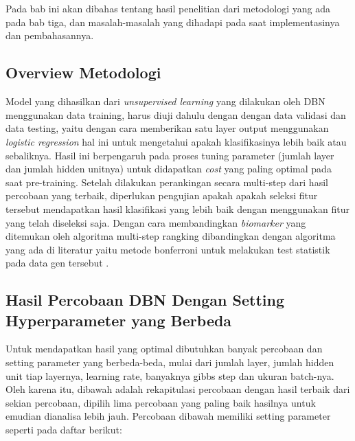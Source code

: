 \chapter{\babEmpat}

Pada bab ini akan dibahas tentang hasil penelitian dari metodologi yang ada pada bab tiga, dan masalah-masalah yang dihadapi pada saat implementasinya dan pembahasannya.


\section{Overview Metodologi}
Model yang dihasilkan dari \textit{unsupervised learning} yang dilakukan oleh DBN menggunakan data training, harus diuji dahulu dengan dengan data validasi dan data testing, yaitu dengan cara memberikan satu layer output menggunakan \textit{logistic regression} hal ini untuk mengetahui apakah klasifikasinya lebih baik atau sebaliknya. Hasil ini berpengaruh pada proses tuning parameter (jumlah layer dan jumlah hidden unitnya) untuk didapatkan \textit{cost} yang paling optimal pada saat pre-training. Setelah dilakukan perankingan secara multi-step dari hasil percobaan yang terbaik, diperlukan pengujian apakah apakah seleksi fitur tersebut mendapatkan hasil klasifikasi yang lebih baik dengan menggunakan fitur yang telah diseleksi saja. Dengan cara membandingkan \textit{biomarker} yang ditemukan oleh algoritma multi-step rangking dibandingkan dengan algoritma yang ada di literatur yaitu metode bonferroni untuk melakukan test statistik pada data gen tersebut \citep{hochberg1988sharper}. 


\section{Hasil Percobaan DBN Dengan Setting Hyperparameter yang Berbeda}
Untuk mendapatkan hasil yang optimal dibutuhkan banyak percobaan dan setting parameter yang berbeda-beda, mulai dari jumlah layer, jumlah hidden unit tiap layernya, learning rate, banyaknya gibbs step dan ukuran batch-nya. Oleh karena itu, dibawah adalah rekapitulasi percobaan dengan hasil terbaik dari sekian percobaan, dipilih lima percobaan yang paling baik hasilnya untuk emudian dianalisa lebih jauh. Percobaan dibawah memiliki setting parameter seperti pada daftar berikut:


